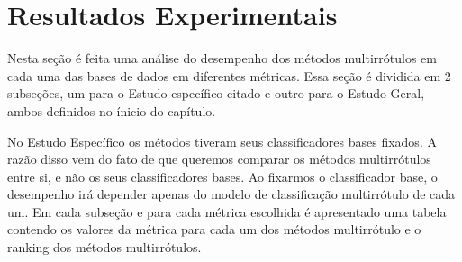

% 


\section{Resultados Experimentais}
\label{sec:exps}
Nesta seção é feita uma análise do desempenho dos métodos multirrótulos em cada uma das bases de dados
em diferentes métricas.
Essa seção é dividida em 2 subseções, um para o Estudo específico citado e
outro para o Estudo Geral, ambos definidos no ínicio do capítulo.

No Estudo Específico os métodos tiveram seus classificadores bases fixados.
A razão disso vem do fato de que queremos comparar os métodos multirrótulos entre si,
e não os seus classificadores bases.
Ao fixarmos o classificador base, 
o desempenho irá depender apenas do modelo de classificação multirrótulo
de cada um.
Em cada subseção e para cada métrica escolhida é apresentado uma tabela
contendo os valores da métrica para cada um dos métodos multirrótulo e
o ranking dos métodos multirrótulos.


% 
% 







